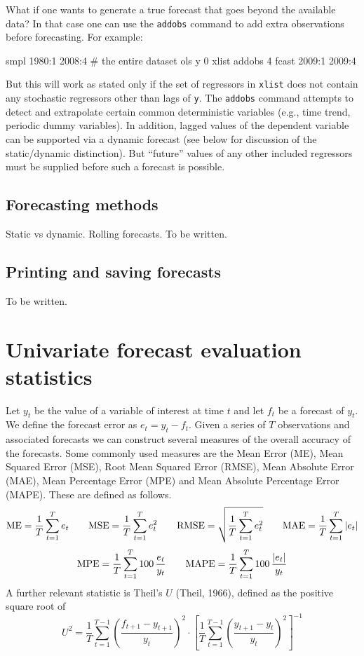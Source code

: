 What if one wants to generate a true forecast that goes beyond the
available data?  In that case one can use the \texttt{addobs} command
to add extra observations before forecasting.  For example:
%
\begin{code}
smpl 1980:1 2008:4 # the entire dataset
ols y 0 xlist
addobs 4
fcast 2009:1 2009:4
\end{code}
%
But this will work as stated only if the set of regressors in
\texttt{xlist} does not contain any stochastic regressors other than
lags of \texttt{y}.  The \texttt{addobs} command attempts to detect
and extrapolate certain common deterministic variables (e.g., time
trend, periodic dummy variables).  In addition, lagged values of the
dependent variable can be supported via a dynamic forecast (see below
for discussion of the static/dynamic distinction).  But ``future''
values of any other included regressors must be supplied before such a
forecast is possible.


\subsection{Forecasting methods}

Static vs dynamic.  Rolling forecasts.  To be written.


\subsection{Printing and saving forecasts}

To be written.

\section{Univariate forecast evaluation statistics}
\label{sec:fcast-stats}

Let $y_t$ be the value of a variable of interest at time $t$ and let
$f_t$ be a forecast of $y_t$.  We define the forecast error as $e_t =
y_t - f_t$.  Given a series of $T$ observations and associated
forecasts we can construct several measures of the overall accuracy of
the forecasts.  Some commonly used measures are the Mean Error (ME),
Mean Squared Error (MSE), Root Mean Squared Error (RMSE), Mean
Absolute Error (MAE), Mean Percentage Error (MPE) and Mean Absolute
Percentage Error (MAPE).  These are defined as follows.
%
\[ {\rm ME} = \frac{1}{T} \sum_{t=1}^T e_t \qquad 
   {\rm MSE} = \frac{1}{T} \sum_{t=1}^T e_t^2 \qquad 
   {\rm RMSE} = \sqrt{\frac{1}{T} \sum_{t=1}^T e_t^2} \qquad 
   {\rm MAE} = \frac{1}{T} \sum_{t=1}^T |e_t|
\] 
%
\[ {\rm MPE} = \frac{1}{T} \sum_{t=1}^T 100\, \frac{e_t}{y_t} \qquad
   {\rm MAPE} = \frac{1}{T} \sum_{t=1}^T 100\, \frac{|e_t|}{y_t} 
\]
%
A further relevant statistic is Theil's $U$ (Theil, 1966), defined as
the positive square root of
%
\[ 
U^2 = \frac{1}{T}
     \sum_{t=1}^{T-1} \left(\frac{f_{t+1} - y_{t+1}}{y_t}\right)^2
     \cdot \left[
     \frac{1}{T} \sum_{t=1}^{T-1} 
        \left(\frac{y_{t+1} - y_t}{y_t}\right)^2 \right]^{-1}
\]


